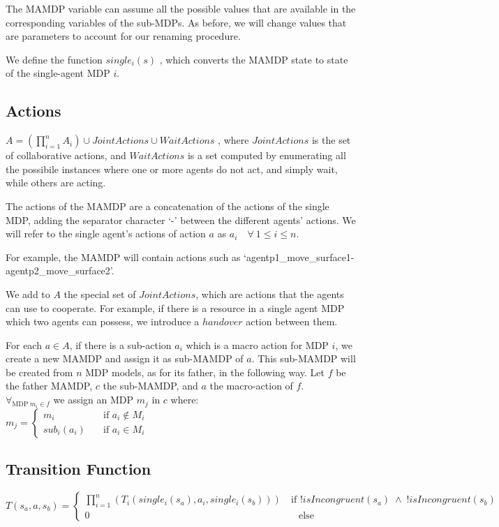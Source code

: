 The MAMDP variable can assume all the possible values that are available in the corresponding variables of the sub-MDPs. As before, we will change values that are parameters to account for our renaming procedure. 

We define the function $single_i(s)$ , which converts the MAMDP state to state of the single-agent MDP $i$.


\subsection{Actions}
$A=(\prod_{i=1}^{n} A_i) \cup JointActions \cup WaitActions$ , where $JointActions$ is the set of collaborative actions, and $WaitActions$ is a set computed by enumerating all the possibile instances where one or more agents do not act, and simply wait, while others are acting.

The actions of the MAMDP are a concatenation of the actions of the single MDP, adding the separator character `-' between the different agents' actions. We will refer to the single agent's actions of action $a$ as $a_i \quad \forall \> 1\leq i \leq n$.

For example, the MAMDP will contain actions such as `agentp1\_move\_surface1-agentp2\_move\_surface2'.

We add to $A$ the special set of $JointActions$, which are actions that the agents can use to cooperate. For example, if there is a resource in a single agent MDP which two agents can possess, we introduce a $handover$ action between them. 

For each $a \in A$, if there is a sub-action $a_i$ which is a macro action for MDP $i$, we create a new MAMDP and assign it as sub-MAMDP of $a$. This sub-MAMDP will be created from $n$ MDP models, as for its father, in the following way. Let $f$ be the father MAMDP, $c$ the sub-MAMDP, and $a$ the macro-action of $f$. \\
 $ \forall_{\text{MDP}\> m_i \in f}$ we assign an MDP $m_j$ in $c$ where:\\
$m_j= \begin{cases}
	m_i & \quad \text{if } a_i \not\in M_i \\
	sub_i(a_i) & \quad \text{if } a_i \in M_i 
\end{cases}$ \\

\subsection{Transition Function}
$T(s_a,a,s_b)=
\begin{cases}
\prod_{i=1}^{n}(T_i(single_i(s_a),a_i,single_i(s_b))) & \> \text{if } !isIncongruent(s_a)\; \land  \;!isIncongruent(s_b)  \\
0   & \quad \text{else}
	\end{cases}$ \\

